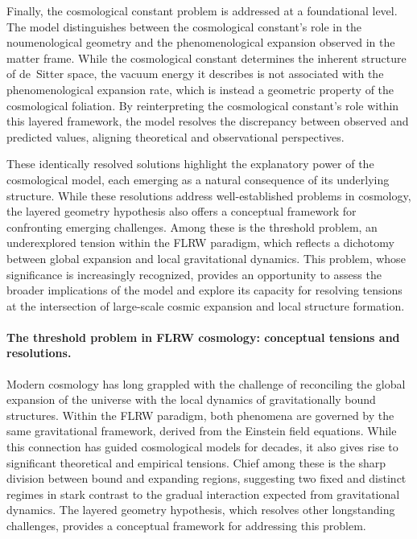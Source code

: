 \documentclass[aps,rmp,groupedaddress,twocolumn,10pt]{revtex4-2}
\begin{document}
Finally, the cosmological constant problem is addressed at a foundational level. The model distinguishes between the cosmological constant's role in the noumenological geometry and the phenomenological expansion observed in the matter frame. While the cosmological constant determines the inherent structure of de~Sitter space, the vacuum energy it describes is not associated with the phenomenological expansion rate, which is instead a geometric property of the cosmological foliation. By reinterpreting the cosmological constant's role within this layered framework, the model resolves the discrepancy between observed and predicted values, aligning theoretical and observational perspectives.

These identically resolved solutions highlight the explanatory power of the cosmological model, each emerging as a natural consequence of its underlying structure. While these resolutions address well-established problems in cosmology, the layered geometry hypothesis also offers a conceptual framework for confronting emerging challenges. Among these is the threshold problem, an underexplored tension within the FLRW paradigm, which reflects a dichotomy between global expansion and local gravitational dynamics. This problem, whose significance is increasingly recognized, provides an opportunity to assess the broader implications of the model and explore its capacity for resolving tensions at the intersection of large-scale cosmic expansion and local structure formation.

\paragraph{The threshold problem in FLRW cosmology: conceptual tensions and resolutions.}
Modern cosmology has long grappled with the challenge of reconciling the global expansion of the universe with the local dynamics of gravitationally bound structures. Within the FLRW paradigm, both phenomena are governed by the same gravitational framework, derived from the Einstein field equations. While this connection has guided cosmological models for decades, it also gives rise to significant theoretical and empirical tensions. Chief among these is the sharp division between bound and expanding regions, suggesting two fixed and distinct regimes in stark contrast to the gradual interaction expected from gravitational dynamics. The layered geometry hypothesis, which resolves other longstanding challenges, provides a conceptual framework for addressing this problem.
\end{document}
